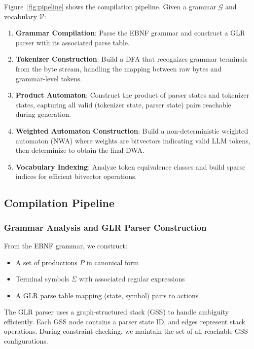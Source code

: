 \documentclass[11pt,a4paper]{article}
\newcommand{\vocab}{\mathcal{V}}
\newcommand{\grammar}{\mathcal{G}}
\theoremstyle{plain}
\theoremstyle{definition}
\theoremstyle{remark}
\begin{document}
Figure~\ref{fig:pipeline} shows the compilation pipeline. Given a grammar $\grammar$ and vocabulary $\vocab$:

\begin{enumerate}
\item \textbf{Grammar Compilation}: Parse the EBNF grammar and construct a GLR parser with its associated parse table.

\item \textbf{Tokenizer Construction}: Build a DFA that recognizes grammar terminals from the byte stream, handling the mapping between raw bytes and grammar-level tokens.

\item \textbf{Product Automaton}: Construct the product of parser states and tokenizer states, capturing all valid (tokenizer state, parser state) pairs reachable during generation.

\item \textbf{Weighted Automaton Construction}: Build a non-deterministic weighted automaton (NWA) where weights are bitvectors indicating valid LLM tokens, then determinize to obtain the final DWA.

\item \textbf{Vocabulary Indexing}: Analyze token equivalence classes and build sparse indices for efficient bitvector operations.
\end{enumerate}

\subsection{Compilation Pipeline}
\label{sec:compilation}

\subsubsection{Grammar Analysis and GLR Parser Construction}

From the EBNF grammar, we construct:
\begin{itemize}
\item A set of productions $P$ in canonical form
\item Terminal symbols $\Sigma$ with associated regular expressions
\item A GLR parse table mapping (state, symbol) pairs to actions
\end{itemize}

The GLR parser uses a graph-structured stack (GSS) to handle ambiguity efficiently. Each GSS node contains a parser state ID, and edges represent stack operations. During constraint checking, we maintain the set of all reachable GSS configurations.
\end{document}
